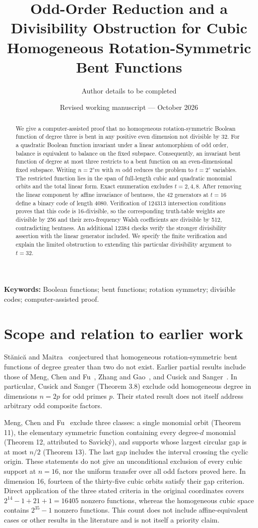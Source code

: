 \documentclass[11pt,a4paper]{article}
\title{Odd-Order Reduction and a Divisibility Obstruction for Cubic Homogeneous Rotation-Symmetric Bent Functions}
\author{Author details to be completed}
\date{Revised working manuscript --- October 2026}
\begin{document}
\maketitle
\begin{abstract}
We give a computer-assisted proof that no homogeneous rotation-symmetric Boolean function of degree three is bent in any positive even dimension not divisible by 32. For a quadratic Boolean function invariant under a linear automorphism of odd order, balance is equivalent to balance on the fixed subspace. Consequently, an invariant bent function of degree at most three restricts to a bent function on an even-dimensional fixed subspace. Writing $n=2^s m$ with $m$ odd reduces the problem to $t=2^s$ variables. The restricted function lies in the span of full-length cubic and quadratic monomial orbits and the total linear form. Exact enumeration excludes $t=2,4,8$. After removing the linear component by affine invariance of bentness, the 42 generators at $t=16$ define a binary code of length 4080. Verification of 124313 intersection conditions proves that this code is 16-divisible, so the corresponding truth-table weights are divisible by 256 and their zero-frequency Walsh coefficients are divisible by 512, contradicting bentness. An additional 12384 checks verify the stronger divisibility assertion with the linear generator included. We specify the finite verification and explain the limited obstruction to extending this particular divisibility argument to $t=32$.
\end{abstract}
\noindent\textbf{Keywords:} Boolean functions; bent functions; rotation symmetry; divisible codes; computer-assisted proof.

\section{Scope and relation to earlier work}
St\u{a}nic\u{a} and Maitra~\cite{stanica} conjectured that homogeneous rotation-symmetric bent functions of degree greater than two do not exist. Earlier partial results include those of Meng, Chen and Fu~\cite{meng}, Zhang and Gao~\cite{zhang}, and Cusick and Sanger~\cite{cusick}. In particular, Cusick and Sanger (Theorem 3.8) exclude odd homogeneous degree in dimensions $n=2p$ for odd primes $p$. Their stated result does not itself address arbitrary odd composite factors.

Meng, Chen and Fu~\cite{meng} exclude three classes: a single monomial orbit (Theorem 11), the elementary symmetric function containing every degree-$d$ monomial (Theorem 12, attributed to Savick\'y), and supports whose largest circular gap is at most $n/2$ (Theorem 13). The last gap includes the interval crossing the cyclic origin. These statements do not give an unconditional exclusion of every cubic support at $n=16$, nor the uniform transfer over all odd factors proved here. In dimension 16, fourteen of the thirty-five cubic orbits satisfy their gap criterion. Direct application of the three stated criteria in the original coordinates covers $2^{14}-1+21+1=16405$ nonzero functions, whereas the homogeneous cubic space contains $2^{35}-1$ nonzero functions. This count does not include affine-equivalent cases or other results in the literature and is not itself a priority claim.
\end{document}
